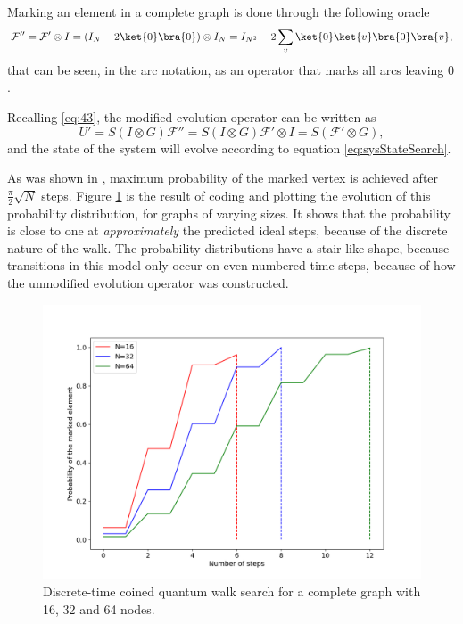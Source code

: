                 Marking an element in a complete graph is done through the following oracle
                \begin{equation}
                    \mathcal{F''} =\mathcal{F'}\otimes I = (I_N - 2\ket{0}\bra{0})\otimes I_N = I_{N^2} - 2 \sum_v \ket{0}\ket{v}\bra{0}\bra{v} ,
                \end{equation}
                that can be seen, in the arc notation, as an operator that marks all arcs leaving $0$.\par
                Recalling \ref{eq:43}, the modified evolution operator can be written as
                \begin{equation}
                    U' = S(I \otimes G)\mathcal{F''} = S(I \otimes G)\mathcal{F'} \otimes I = S (\mathcal{F'} \otimes G),\label{modifiedEvoCoined}
                \end{equation}
                and the state of the system will evolve according to equation \ref{eq:sysStateSearch}.\par
                As was shown in \cite{REN1}, maximum probability of the marked vertex is achieved after $\frac{\pi}{2}\sqrt{N}$ steps. Figure \ref{fig:coinedSearch} is the result of coding and plotting the evolution of this probability distribution, for graphs of varying sizes. It shows that the probability is close to one at \textit{approximately} the predicted ideal steps, because of the discrete nature of the walk. The probability distributions have a stair-like shape, because transitions in this model only occur on even numbered time steps, because of how the unmodified evolution operator was constructed.
                
            	\begin{figure}[!h]
                    \centering
                    \includegraphics[scale=0.40]{img/CoinedQuantumWalk/Search/CoinedSearch163264.png}
                     \caption{Discrete-time coined quantum walk search for a complete graph with 16, 32 and 64 nodes.}\label{fig:coinedSearch}
                \end{figure}
                
